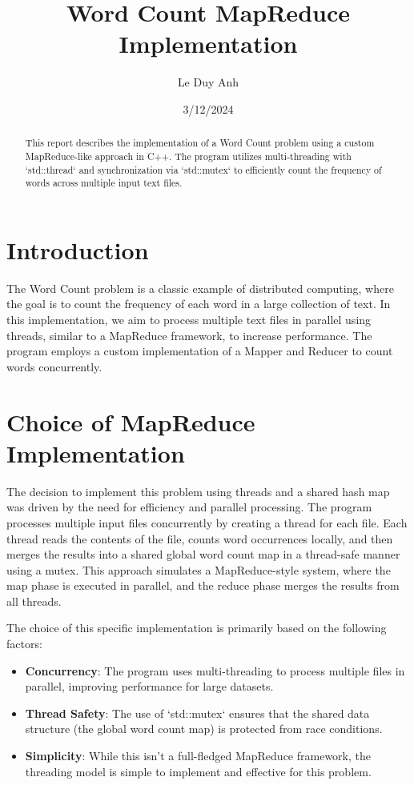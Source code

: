 \documentclass[12pt]{article}
\title{Word Count MapReduce Implementation}
\author{Le Duy Anh}
\date{3/12/2024}
\begin{document}
\maketitle

\begin{abstract}
This report describes the implementation of a Word Count problem using a custom MapReduce-like approach in C++. The program utilizes multi-threading with `std::thread` and synchronization via `std::mutex` to efficiently count the frequency of words across multiple input text files.
\end{abstract}

\section{Introduction}
The Word Count problem is a classic example of distributed computing, where the goal is to count the frequency of each word in a large collection of text. In this implementation, we aim to process multiple text files in parallel using threads, similar to a MapReduce framework, to increase performance. The program employs a custom implementation of a Mapper and Reducer to count words concurrently.

\section{Choice of MapReduce Implementation}
The decision to implement this problem using threads and a shared hash map was driven by the need for efficiency and parallel processing. The program processes multiple input files concurrently by creating a thread for each file. Each thread reads the contents of the file, counts word occurrences locally, and then merges the results into a shared global word count map in a thread-safe manner using a mutex. This approach simulates a MapReduce-style system, where the map phase is executed in parallel, and the reduce phase merges the results from all threads.

The choice of this specific implementation is primarily based on the following factors:
\begin{itemize}
    \item \textbf{Concurrency}: The program uses multi-threading to process multiple files in parallel, improving performance for large datasets.
    \item \textbf{Thread Safety}: The use of `std::mutex` ensures that the shared data structure (the global word count map) is protected from race conditions.
    \item \textbf{Simplicity}: While this isn't a full-fledged MapReduce framework, the threading model is simple to implement and effective for this problem.
\end{itemize}
\end{document}

